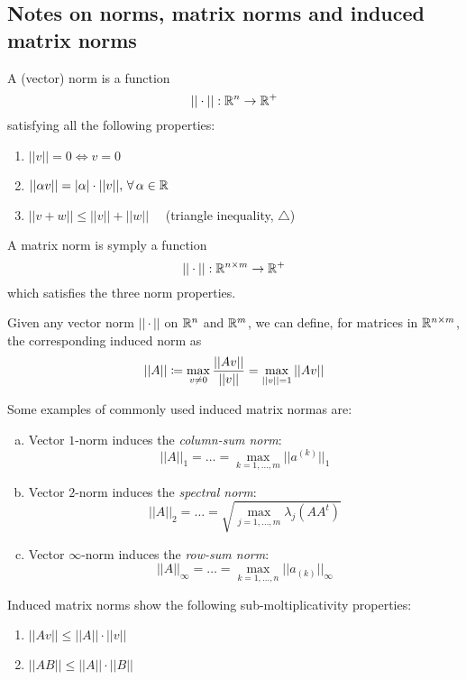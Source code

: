 \subsection[Notes on norms]{Notes on norms, matrix norms and induced matrix norms}
\begin{Def}[Norm]
	A (vector) norm is a function
	\begin{equation*}
		||\cdot|| : \mathbb{R}^n \to \mathbb{R}^+
	\end{equation*}
	satisfying all the following properties:
	\begin{enumerate}
		\item $||v|| = 0 \iff v = 0$
		\item $||\alpha v|| = |\alpha|\cdot||v||,\,\forall\, \alpha \in \mathbb{R}$
		\item $||v + w|| \leq ||v|| + ||w|| \quad$ (triangle inequality, $\triangle$)
	\end{enumerate}
\end{Def}
\begin{Def}
	A matrix norm is symply a function
	\begin{equation*}
		||\cdot|| : \mathbb{R}^{n \times m} \to \mathbb{R}^+
	\end{equation*}
	which satisfies the three norm properties.
\end{Def}
\begin{Def}
	Given any vector norm $||\cdot||$ on $\mathbb{R}^n$ and $\mathbb{R}^m$, we can define, for matrices in $\mathbb{R}^{n \times m}$, the corresponding induced norm as
	\begin{dmath*}
		||A|| \definedas \max_{v \neq 0} \frac{||Av||}{||v||} = \max_{||v|| = 1} ||Av||
	\end{dmath*}
\end{Def}
\begin{Ex}
Some examples of commonly used induced matrix normas are:
\begin{enumerate}[(a)]
	\item 	Vector $1$-norm induces the \emph{column-sum norm}:
	\begin{dmath*}
		||A||_1 = \ldots = \max_{k=1,\ldots,m} ||a^{(k)}||_1
	\end{dmath*}
	\item 	Vector $2$-norm induces the \emph{spectral norm}:
	\begin{dmath*}
		||A||_2 = \ldots = \sqrt{\max_{j=1,\ldots,m} \lambda_j (AA^t)}
	\end{dmath*}
	\item 	Vector $\infty$-norm induces the \emph{row-sum norm}:
	\begin{dmath*}
		||A||_\infty = \ldots = \max_{k=1,\ldots,n} ||a_{(k)}||_\infty
	\end{dmath*}
\end{enumerate}
\end{Ex}
\begin{Rem}
	Induced matrix norms show the following sub-moltiplicativity properties:
	\begin{enumerate}
		\item $||Av|| \leq ||A||\cdot||v||$
		\item $||AB|| \leq ||A||\cdot||B||$
	\end{enumerate}
\end{Rem}
